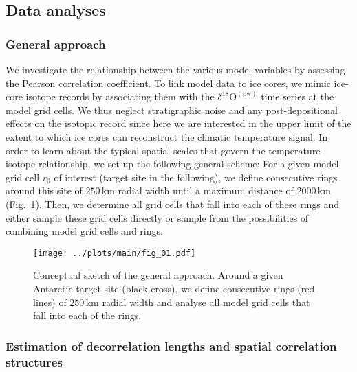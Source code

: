 \documentclass[cp, manuscript]{copernicus}
\begin{document}
\subsection{Data analyses}\label{methods:main}

\subsubsection{General approach}

We investigate the relationship between the various model variables by assessing
the Pearson correlation coefficient. To link model data to ice cores, we mimic
ice-core isotope records by associating them with the
$\delta^{18}\mathrm{O}^{\mathrm{(pw)}}$ time series at the model grid cells. We
thus neglect stratigraphic noise and any post-depositional effects on the
isotopic record since here we are interested in the upper limit of the extent to
which ice cores can reconstruct the climatic temperature signal. In order to
learn about the typical spatial scales that govern the temperature--isotope
relationship, we set up the following general scheme: For a given model grid
cell $r_0$ of interest (target site in the following), we define consecutive
rings around this site of $250$\,km radial width until a maximum distance of
$2000$\,km (Fig.~\ref{fig:concept}). Then, we determine all grid cells that fall
into each of these rings and either sample these grid cells directly or sample
from the possibilities of combining model grid cells and rings.

\begin{figure}[t]%
\centering
\texttt{[image: ../plots/main/fig\_01.pdf]}
\caption[Conceptual approach]{%
  Conceptual sketch of the general approach. Around a given Antarctic target
  site (black cross), we define consecutive rings (red lines) of $250$\,km
  radial width and analyse all model grid cells that fall into each of the
  rings.}
\label{fig:concept}%
\end{figure}%

\subsubsection{Estimation of decorrelation lengths and spatial correlation
  structures}\label{methods:decor.model}
\end{document}
